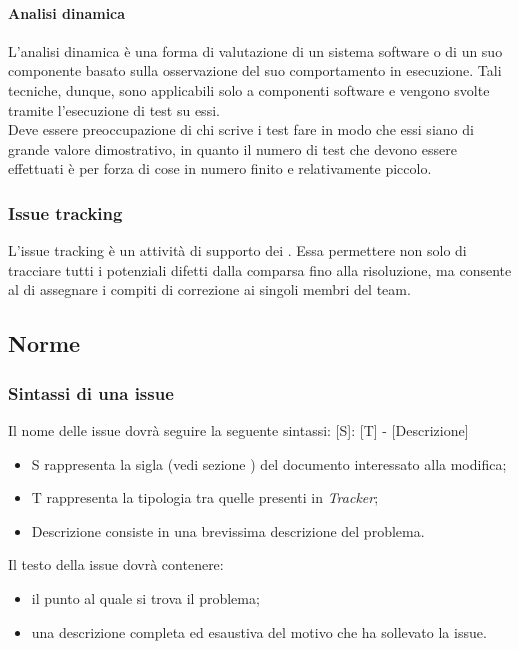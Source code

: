 			\paragraph{Analisi dinamica}
				L'analisi dinamica è una forma di valutazione di un sistema software o di un suo componente basato sulla osservazione del suo comportamento in esecuzione. Tali tecniche, dunque, sono applicabili solo a componenti software e vengono svolte tramite l'esecuzione di test su essi.\\
				Deve essere preoccupazione di chi scrive i test fare in modo che essi siano di grande valore dimostrativo, in quanto il numero di test che devono essere effettuati è per forza di cose in numero finito e relativamente piccolo.
		\subsubsection{Issue tracking}
			L'issue tracking è un attività di supporto dei . Essa permettere non solo di tracciare tutti i potenziali difetti dalla comparsa fino alla risoluzione, ma consente al  di assegnare i compiti di correzione ai singoli membri del team.
		

	\subsection{Norme}
		\subsubsection{Sintassi di una issue}
			Il nome delle issue dovrà seguire la seguente sintassi: [S]: [T] - [Descrizione]
			\begin{itemize}
				\item S rappresenta la sigla (vedi sezione ) del documento interessato alla modifica;
				\item T rappresenta la tipologia tra quelle presenti in \textit{Tracker};
				\item Descrizione consiste in una brevissima descrizione del problema.
			\end{itemize}
			Il testo della issue dovrà contenere:
			\begin{itemize}
				\item il punto al quale si trova il problema;
				\item una descrizione completa ed esaustiva del motivo che ha sollevato la issue.
			\end{itemize}
			
